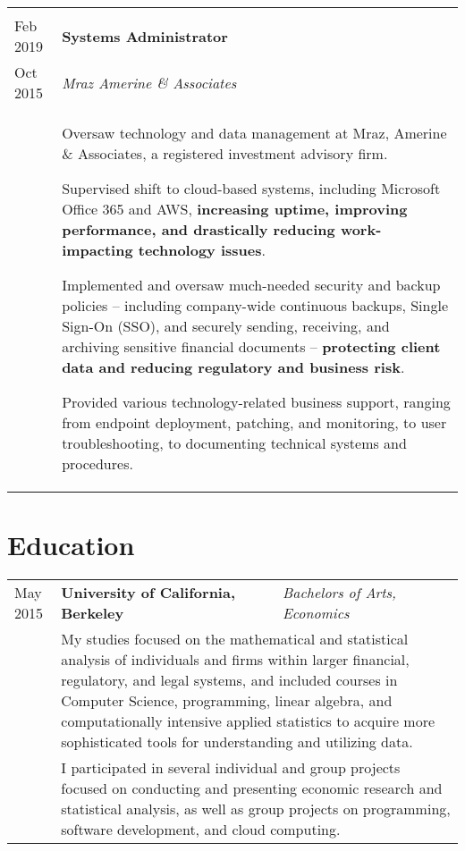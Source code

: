 \documentclass[10pt]{article}
\newcommand{\afterlistspace}[0]{\vspace{-1.5em}}
\begin{document}
\begin{tabular}{p{1.5cm}|p{16cm}}
    \\
    \multicolumn{2}{c}{}
    \\

    Feb 2019 & \textbf{Systems Administrator}
    \\
    Oct 2015 & \emph{Mraz Amerine \& Associates}
    \\
    & \begin{itemize}
        \footnotesize{
            \item Oversaw technology and data management at Mraz, Amerine \& Associates, a registered investment advisory firm.
            
            \item Supervised shift to cloud-based systems, including Microsoft Office 365 and AWS, \textbf{increasing uptime, improving performance, and drastically reducing work-impacting technology issues}.
            
            \item Implemented and oversaw much-needed security and backup policies -- including company-wide continuous backups, Single Sign-On (SSO), and securely sending, receiving, and archiving sensitive financial documents -- \textbf{protecting client data and reducing regulatory and business risk}.

            \item Provided various technology-related business support, ranging from endpoint deployment, patching, and monitoring, to user troubleshooting, to documenting technical systems and procedures.
        }

        \afterlistspace
    \end{itemize}

\end{tabular}


\section{Education}

\begin{tabular}{p{1.5cm}|l|p{16cm}}
    May 2015 & \textbf{University of California, Berkeley} & \emph{Bachelors of Arts, Economics}
    \\
    & \multicolumn{2}{p{16cm}}{\footnotesize{My studies focused on the mathematical and statistical analysis of individuals and firms within larger financial, regulatory, and legal systems, and included courses in Computer Science, programming, linear algebra, and computationally intensive applied statistics to acquire more sophisticated tools for understanding and utilizing data.}}
    \\
    & \multicolumn{2}{p{16cm}}{\footnotesize{I participated in several individual and group projects focused on conducting and presenting economic research and statistical analysis, as well as group projects on programming, software development, and cloud computing.}}
\end{tabular}
\end{document}
